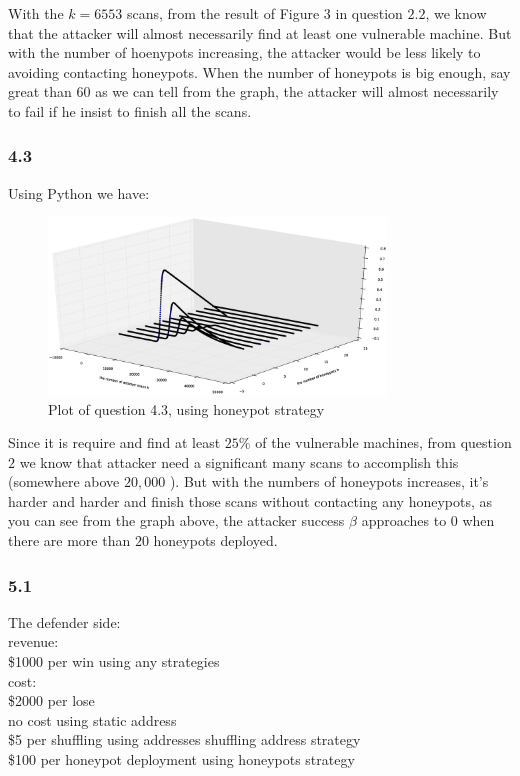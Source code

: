 \documentclass[10pt]{article}
\begin{document}
With the $k=6553$ scans, from the result of Figure $3$ in question $2.2$, we know that the attacker will almost necessarily find at least one vulnerable machine. But with the number of hoenypots increasing, the attacker would be less likely to avoiding contacting honeypots. When the number of honeypots is big enough, say great than $60$ as we can tell from the graph, the attacker will almost necessarily to fail if he insist to finish all the scans. 


\subsubsection*{4.3}

Using Python we have:

\begin{figure}[H]
\begin{center}
\includegraphics[width=0.8\textwidth]{figure4.3.eps}
\caption{Plot of question 4.3, using honeypot strategy }
\end{center}
\end{figure}

Since it is require and find at least $25\%$ of the vulnerable machines, from question $2$ we know that attacker need a significant many scans to accomplish this (somewhere above $20,000$ ). But with the numbers of honeypots increases, it's harder and harder and finish those scans without contacting any honeypots, as you can see from the graph above, the attacker success $\beta$ approaches to $0$ when there are more than $20$ honeypots deployed. 


\subsubsection*{5.1}

The defender side: \\
\indent revenue:  \\ 
\$1000 per win using any strategies \\
\indent cost: \\
\$2000 per lose \\
no cost using static address \\
\$5 per shuffling using addresses shuffling address strategy \\
\$100 per honeypot deployment using honeypots strategy \\ \\
\end{document}
